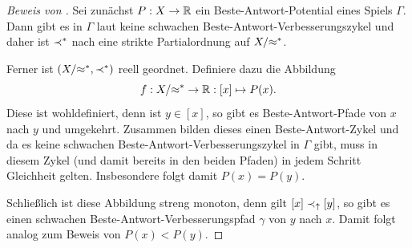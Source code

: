 \begin{proof}[Beweis von ]
	Sei zunächst $P: X \to \mathbb{R}$ ein Beste-Antwort-Potential eines Spiels $\Gamma$. Dann gibt es in $\Gamma$ laut  keine schwachen Beste-Antwort-Verbesserungszykel und daher ist $\prec^\ast$ nach  eine strikte Partialordnung auf $X/{\approx^\ast}$.
	
	Ferner ist $(X/{\approx^\ast}, \prec^\ast)$ reell geordnet. Definiere dazu die Abbildung 
		\[f: X/{\approx^\ast} \to \mathbb{R}: [x] \mapsto P(x).\]
	Diese ist wohldefiniert, denn ist $y \in [x]$, so gibt es Beste-Antwort-Pfade von $x$ nach $y$ und umgekehrt. Zusammen bilden dieses einen Beste-Antwort-Zykel und da es keine schwachen Beste-Antwort-Verbesserungszykel in $\Gamma$ gibt, muss in diesem Zykel (und damit bereits in den beiden Pfaden) in jedem Schritt Gleichheit gelten. Insbesondere folgt damit $P(x) = P(y)$.
		
	Schließlich ist diese Abbildung streng monoton, denn gilt $[x] \prec_\uparrow [y]$, so gibt es einen schwachen Beste-Antwort-Verbesserungspfad $\gamma$ von $y$ nach $x$. Damit folgt analog zum Beweis von  $P(x) < P(y)$.
	

\end{proof}

